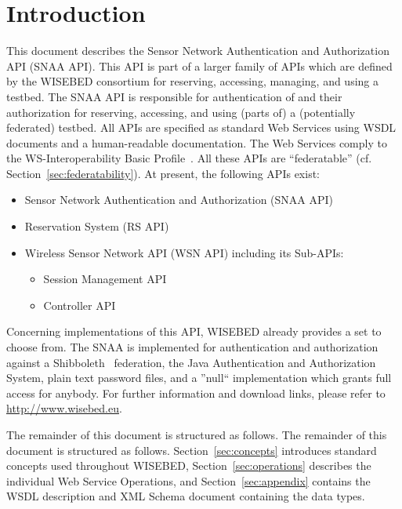 \documentclass[a4paper,12pt]{article}
\begin{document}
    \prepareTitle

	\section{Introduction}
	\label{sec:introduction}
This document describes the Sensor Network Authentication and Authorization API (SNAA API). This API is part of a larger family of APIs which are defined by the WISEBED consortium for reserving, accessing, managing, and using a testbed. The SNAA API is responsible for authentication of and their authorization for reserving, accessing, and using (parts of) a (potentially federated) testbed. All APIs are specified as standard Web Services using WSDL documents and a human-readable documentation. The Web Services comply to the WS-Interoperability Basic Profile~\cite{wsi-basic-profile-1-1}. All these APIs are ``federatable'' (cf. Section~\ref{sec:federatability}). At present, the following APIs exist:

\begin{itemize}
	\item Sensor Network Authentication and Authorization (SNAA API)
	\item Reservation System (RS API)
	\item Wireless Sensor Network API (WSN API) including its Sub-APIs:
	\begin{itemize}
		\item Session Management API
		\item Controller API
	\end{itemize}
\end{itemize}

Concerning implementations of this API, WISEBED already provides a set to choose from. The SNAA is implemented for authentication and authorization against a Shibboleth~\cite{shibboleth} federation, the Java Authentication and Authorization System, plain text password files, and a ''null`` implementation which grants full access for anybody. For further information and download links, please refer to \url{http://www.wisebed.eu}.

The remainder of this document is structured as follows. The remainder of this document is structured as follows. Section~\ref{sec:concepts} introduces standard concepts used throughout WISEBED, Section~\ref{sec:operations} describes the individual Web Service Operations, and Section~\ref{sec:appendix} contains the WSDL description and XML Schema document containing the data types.
\end{document}
